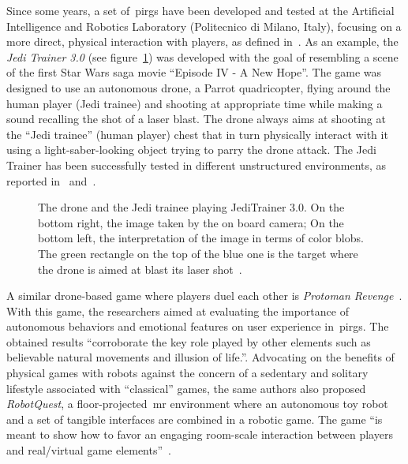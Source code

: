 Since some years, a set of~\glspl{pirg} have been developed and tested at the Artificial Intelligence and Robotics Laboratory (Politecnico di Milano, Italy), focusing on a more direct, physical interaction with players, as defined in~\cite{martinoia_physically_2013}. As an example, the \textit{Jedi Trainer 3.0} (see figure~\ref{fig:jedi_trainer}) was developed with the goal of resembling a scene of the first Star Wars saga movie ``Episode IV - A New Hope''. The game was designed to use an autonomous drone, a Parrot quadricopter, flying around the human player (Jedi trainee) and shooting at appropriate time while making a sound recalling the shot of a laser blast. The drone always aims at shooting at the ``Jedi trainee'' (human player) chest that in turn physically interact with it using a light-saber-looking object trying to parry the drone attack. The Jedi Trainer has been successfully tested in different unstructured environments, as reported in~\cite{bonarini_timing_2014} and~\cite{martinoia_physically_2013}.

\begin{figure}[h]
  \centering  
  \caption{The drone and the Jedi trainee playing JediTrainer 3.0. On the bottom right, the image taken by the on board camera; On the bottom left, the interpretation of the image in terms of color blobs. The green rectangle on the top of the blue one is the target where the drone is aimed at blast its laser shot~\citep{bonarini_timing_2014}.}
  \label{fig:jedi_trainer}
\end{figure}

A similar drone-based game where players duel each other is \textit{Protoman Revenge}~\citep{lamberti_robotic_2018}. With this game, the researchers aimed at evaluating the importance of autonomous behaviors and emotional features on user experience in~\glspl{pirg}. The obtained results ``corroborate the key role played by other elements such as believable natural movements and illusion of life.''. Advocating on the benefits of physical games with robots against the concern of a sedentary and solitary lifestyle associated with ``classical'' games, the same authors also proposed \textit{RobotQuest}, a floor-projected~\gls{mr} environment where an autonomous toy robot and a set of tangible interfaces are combined in a robotic game. The game ``is meant to show how to favor an engaging room-scale interaction between players and real/virtual game elements''~\citep{lamberti_robotquest:_2018}.

